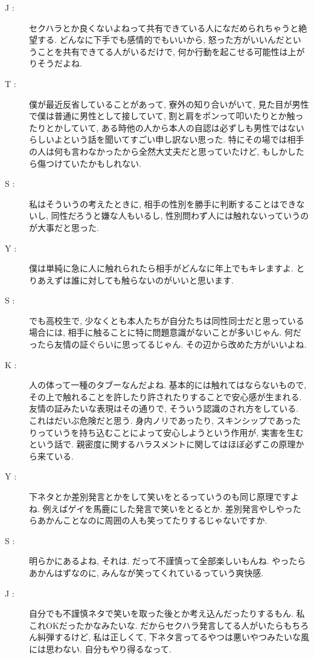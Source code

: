 \documentclass[10pt,b5jsbook,dvips,dvipdfmx,openany]{jsbook}
\theoremstyle{definition}
\begin{document}
\begin{multicols}{2}
\begin{description}
		\item[ J : ] セクハラとか良くないよねって共有できている人になだめられちゃうと絶望する. どんなに下手でも感情的でもいいから, 怒った方がいいんだということを共有できてる人がいるだけで, 何か行動を起こせる可能性は上がりそうだよね.

		\item[ T : ] 僕が最近反省していることがあって, 寮外の知り合いがいて, 見た目が男性で僕は普通に男性として接していて, 割と肩をポンって叩いたりとか触ったりとかしていて, ある時他の人から本人の自認は必ずしも男性ではないらしいよという話を聞いてすごい申し訳ない思った. 特にその場では相手の人は何も言わなかったから全然大丈夫だと思っていたけど, もしかしたら傷つけていたかもしれない.

		\item[ S : ] 私はそういうの考えたときに, 相手の性別を勝手に判断することはできないし, 同性だろうと嫌な人もいるし, 性別問わず人には触れないっていうのが大事だと思った.

		\item[ Y : ] 僕は単純に急に人に触れられたら相手がどんなに年上でもキレますよ. とりあえずは誰に対しても触らないのがいいと思います.

		\item[ S : ] でも高校生で, 少なくとも本人たちが自分たちは同性同士だと思っている場合には, 相手に触ることに特に問題意識がないことが多いじゃん.  何だったら友情の証ぐらいに思ってるじゃん.  その辺から改めた方がいいよね.

		\item[ K : ] 人の体って一種のタブーなんだよね. 基本的には触れてはならないもので, その上で触れることを許したり許されたりすることで安心感が生まれる. 友情の証みたいな表現はその通りで, そういう認識のされ方をしている. これはだいぶ危険だと思う. 身内ノリであったり, スキンシップであったりっていうを持ち込むことによって安心しようという作用が, 実害を生むという話で. 親密度に関するハラスメントに関してはほぼ必ずこの原理から来ている.

		\item[ Y : ] 下ネタとか差別発言とかをして笑いをとるっていうのも同じ原理ですよね. 例えばゲイを馬鹿にした発言で笑いをとるとか. 差別発言やしやったらあかんことなのに周囲の人も笑ってたりするじゃないですか.

		\item[ S : ] 明らかにあるよね, それは. だって不謹慎って全部楽しいもんね. やったらあかんはずなのに, みんなが笑ってくれているっていう爽快感.

		\item[ J : ] 自分でも不謹慎ネタで笑いを取った後とか考え込んだったりするもん. 私これOKだったかなみたいな. だからセクハラ発言してる人がいたらもちろん糾弾するけど, 私は正しくて, 下ネタ言ってるやつは悪いやつみたいな風には思わない. 自分もやり得るなって.


\end{description}
\end{multicols}
\end{document}
